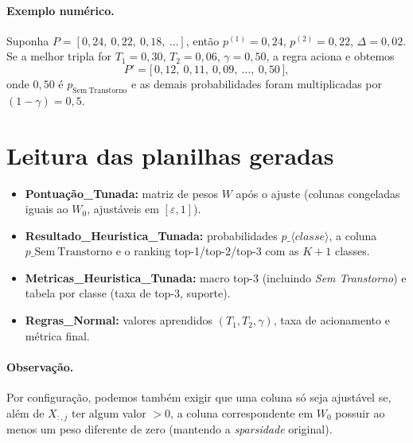 \documentclass[11pt,a4paper]{article}
\begin{document}
\paragraph{Exemplo numérico.}
Suponha $P=[0{,}24,\ 0{,}22,\ 0{,}18,\ \ldots]$, então $p^{(1)}=0{,}24$, $p^{(2)}=0{,}22$, $\Delta=0{,}02$.
Se a melhor tripla for $T_1{=}0{,}30$, $T_2{=}0{,}06$, $\gamma{=}0{,}50$, a regra aciona e obtemos
\begin{equation}
  P'=\big[\,0{,}12,\ 0{,}11,\ 0{,}09,\ \ldots,\ 0{,}50\,\big],
\end{equation}
onde $0{,}50$ é $p_{\mathrm{Sem\ Transtorno}}$ e as demais probabilidades foram multiplicadas por $(1{-}\gamma)=0{,}5$.

\section{Leitura das planilhas geradas}
\begin{itemize}[leftmargin=1.5em]
  \item \textbf{Pontuação\_Tunada:} matriz de pesos $W$ após o ajuste (colunas congeladas iguais ao $W_0$, ajustáveis em $[\varepsilon,1]$).
  \item \textbf{Resultado\_Heuristica\_Tunada:} probabilidades $p\_{\langle classe\rangle}$, a coluna $p\_{\mathrm{Sem\ Transtorno}}$ e o ranking top-1/top-2/top-3 com as $K{+}1$ classes.
  \item \textbf{Metricas\_Heuristica\_Tunada:} macro top-3 (incluindo \emph{Sem Transtorno}) e tabela por classe (taxa de top-3, suporte).
  \item \textbf{Regras\_Normal:} valores aprendidos $(T_1,T_2,\gamma)$, taxa de acionamento e métrica final.
\end{itemize}

\paragraph{Observação.} Por configuração, podemos também exigir que uma coluna só seja ajustável se, além de $X_{:,j}$ ter algum valor $>0$, a coluna correspondente em $W_0$ possuir ao menos um peso diferente de zero (mantendo a \emph{sparsidade} original).
\end{document}
